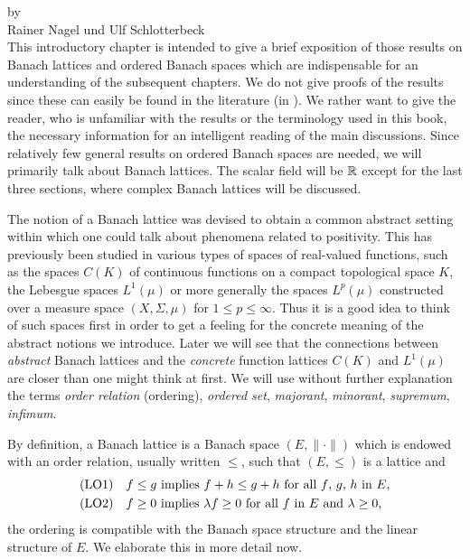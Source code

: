 \label{chap:c1}%
\thispagestyle{empty}
{\Large
\vspace*{-.75cm}
by \\[.25em]
Rainer Nagel und Ulf Schlotterbeck
\vspace{.75cm}
\\
}
This introductory chapter is intended to give a brief exposition of those results on Banach lattices and ordered Banach spaces which are indispensable for an understanding of the subsequent chapters.
We do not give proofs of the results since these can easily be found in the literature (\eg in \textcite{schaefer:1974}).
We rather want to give the reader, who is unfamiliar with the results or the terminology used in this book, the necessary information for an intelligent reading of the main discussions.
Since relatively few general results on ordered Banach spaces are needed, we will primarily talk about Banach lattices.
The scalar field will be $\mathbb{R}$ except for the last three sections, where complex Banach lattices will be discussed.

The notion of a Banach lattice was devised to obtain a common abstract setting within which one could talk about phenomena related to positivity.
This has previously been studied in various types of spaces of real-valued functions, such as the spaces $ C(K) $ of continuous functions on a compact topological space $ K $, the Lebesgue spaces $ L^{1}(\mu) $ or more generally the spaces $ L^{p}(\mu) $ constructed over a measure space $ (X,\Sigma,\mu) $ for $ 1 \leq p \leq \infty $.
Thus it is a good idea to think of such spaces first in order to get a feeling for the concrete meaning of the abstract notions we introduce.
Later we will see that the connections between \emph{abstract} Banach lattices and the \emph{concrete} function lattices $ C(K) $ and $ L^{1}(\mu) $ are closer than one might think at first.
We will use without further explanation the terms \emph{order relation} (ordering), \emph{ordered set}, \emph{majorant}, \emph{minorant}, \emph{supremum}, \emph{infimum}.

By definition, a Banach lattice is a Banach space $ (E,\|\cdot\|) $ which is endowed with an order relation, usually written $ \leq $, such that $ (E,\leq) $ is a lattice and 
\begin{align*}
 &\mathrm{(LO1)} \quad \text{$f \leq g$ implies $f + h \leq g + h $
 	 for all $ f $, $ g $, $ h $ in  $ E $,}  \\
 &\mathrm{(LO2)} \quad \text{$f \geq 0$  implies   $\lambda f \geq 0$ for all $ f $ in $ E $ 
 	and  $\lambda \geq 0$,}
\end{align*}
\ie the ordering is compatible with the Banach space structure and the linear structure of\/ $ E $.
We elaborate this in more detail now.


